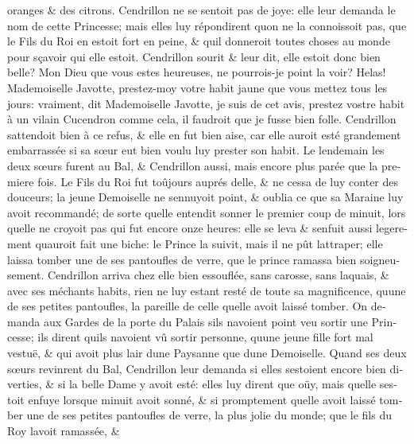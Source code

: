 \documentclass[14pt,a4paper]{memoir}
\begin{document}
{{\begin{otherlanguage}{french}
oranges \& des citrons. Cendrillon ne se sentoit pas de joye: elle leur
demanda le nom de cette Princesse; mais elles luy répondirent
qu\textquotesingle on ne la connoissoit pas, que le Fils du Roi en
estoit fort en peine, \& qu\textquotesingle il donneroit toutes choses
au monde pour sçavoir qui elle estoit. Cendrillon sourit \& leur dit,
elle estoit donc bien belle? Mon Dieu que vous estes heureuses, ne
pourrois-je point la voir? Helas! Mademoiselle Javotte, prestez-moy
votre habit jaune que vous mettez tous les jours: vraiment, dit
Mademoiselle Javotte, je suis de cet avis, prestez vostre habit à un
vilain Cucendron comme cela, il faudroit que je fusse bien folle.
Cendrillon s\textquotesingle attendoit bien à ce refus, \& elle en fut
bien aise, car elle auroit esté grandement embarrassée si sa sœur eut
bien voulu luy prester son habit. Le lendemain les deux sœurs furent au
Bal, \& Cendrillon aussi, mais encore plus parée que la premiere fois.
Le Fils du Roi fut toûjours auprés d\textquotesingle elle, \& ne cessa
de luy conter des douceurs; la jeune Demoiselle ne
s\textquotesingle ennuyoit point, \& oublia ce que sa Maraine luy avoit
recommandé; de sorte qu\textquotesingle elle entendit sonner le premier
coup de minuit, lors qu\textquotesingle elle ne croyoit pas qui fut
encore onze heures: elle se leva \& s\textquotesingle enfuit aussi
legerement qu\textquotesingle auroit fait une biche: le Prince la
suivit, mais il ne pût l\textquotesingle attraper; elle laissa tomber
une de ses pantoufles de verre, que le prince ramassa bien
soigneusement. Cendrillon arriva chez elle bien essouflée, sans carosse,
sans laquais, \& avec ses méchants habits, rien ne luy estant resté de
toute sa magnificence, qu\textquotesingle une de ses petites pantoufles,
la pareille de celle qu\textquotesingle elle avoit laissé tomber. On
demanda aux Gardes de la porte du Palais s\textquotesingle ils
n\textquotesingle avoient point veu sortir une Princesse; ils dirent
qu\textquotesingle ils n\textquotesingle avoient vû sortir personne,
qu\textquotesingle une jeune fille fort mal vestuë, \& qui avoit plus
l\textquotesingle air d\textquotesingle une Paysanne que
d\textquotesingle une Demoiselle. Quand ses deux sœurs revinrent du Bal,
Cendrillon leur demanda si elles s\textquotesingle estoient encore bien
diverties, \& si la belle Dame y avoit esté: elles luy dirent que oüy,
mais qu\textquotesingle elle s\textquotesingle estoit enfuye lorsque
minuit avoit sonné, \& si promptement qu\textquotesingle elle avoit
laissé tomber une de ses petites pantoufles de verre, la plus jolie du
monde; que le fils du Roy l\textquotesingle avoit ramassée, \&

\end{otherlanguage}}}
\end{document}
